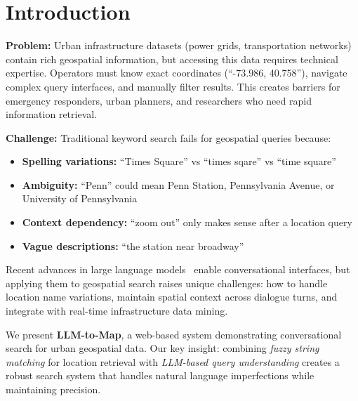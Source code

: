 \documentclass[sigconf]{acmart}
\begin{document}

\maketitle

\section{Introduction}

\textbf{Problem:} Urban infrastructure datasets (power grids, transportation networks) contain rich geospatial information, but accessing this data requires technical expertise. Operators must know exact coordinates (``-73.986, 40.758''), navigate complex query interfaces, and manually filter results. This creates barriers for emergency responders, urban planners, and researchers who need rapid information retrieval.

\textbf{Challenge:} Traditional keyword search fails for geospatial queries because:
\begin{itemize}
    \item \textbf{Spelling variations:} ``Times Square'' vs ``times sqare'' vs ``time square''
    \item \textbf{Ambiguity:} ``Penn'' could mean Penn Station, Pennsylvania Avenue, or University of Pennsylvania
    \item \textbf{Context dependency:} ``zoom out'' only makes sense after a location query
    \item \textbf{Vague descriptions:} ``the station near broadway''
\end{itemize}

Recent advances in large language models~\cite{achiam2023gpt,zhou2023comprehensive} enable conversational interfaces, but applying them to geospatial search raises unique challenges: how to handle location name variations, maintain spatial context across dialogue turns, and integrate with real-time infrastructure data mining.

We present \textbf{LLM-to-Map}, a web-based system demonstrating conversational search for urban geospatial data. Our key insight: combining \textit{fuzzy string matching} for location retrieval with \textit{LLM-based query understanding} creates a robust search system that handles natural language imperfections while maintaining precision.
\end{document}

